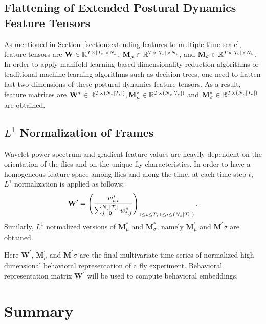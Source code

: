 \subsection{Flattening of Extended Postural Dynamics Feature Tensors}
As mentioned in Section~\ref{section:extending-features-to-multiple-time-scale}, feature tensors are $\mathbf{W} \in \mathbb{R}^{T \times \lvert\mathcal{T}_s\rvert \times N_s}$, $\mathbf{M}_\mu \in \mathbb{R}^{T \times \lvert\mathcal{T}_v\rvert \times N_v}$, and  $\mathbf{M}_\sigma \in \mathbb{R}^{T \times \lvert\mathcal{T}_v\rvert \times N_v}$.
In order to apply manifold learning based dimensionality reduction algorithms or traditional machine learning algorithms such as decision trees, one need to flatten last two dimensions of these postural dynamics feature tensors.
As a result, feature matrices are $\mathbf{W}^\ast \in \mathbb{R}^{T \times \left( N_s\lvert\mathcal{T}_s\rvert\right)}, \mathbf{M}_\mu^\ast \in \mathbb{R}^{T \times \left( N_v\lvert\mathcal{T}_v\rvert\right)}$ and $\mathbf{M}_\sigma^\ast \in \mathbb{R}^{T \times \left( N_v\lvert\mathcal{T}_v\rvert\right)}$ are obtained.

\subsection{\texorpdfstring{$L^1$}{L1} Normalization of Frames}
Wavelet power spectrum and gradient feature values are heavily dependent on the orientation of the flies and on the unique fly characteristics.
In order to have a homogeneous feature space among flies and along the time, at each time step $t$, $L^1$ normalization is applied as follows;
\begin{equation}
	\mathbf{W}^{\prime}  = \left(\frac{w^\ast_{t,i}}{\sum_{j=0}^{N_s \lvert\mathcal{T}_s\rvert}w^\ast_{t, j}}\right)_{1 \leq t \leq T, \, 1 \leq i \leq \left(N_s \lvert\mathcal{T}_s\rvert\right)}.
\end{equation}
Similarly, $L^1$ normalized versions of $\mathbf{M}^\ast_\mu$ and $\mathbf{M}^\ast_\sigma$, namely $\mathbf{M}^\prime_\mu$ and $\mathbf{M}^\prime\sigma$ are obtained.

Here $\mathbf{W}^\prime$, $\mathbf{M}^\prime_\mu$ and $\mathbf{M}^\prime\sigma$ are the final multivariate time series of normalized high dimensional behavioral representation of a fly experiment. Behavioral representation matrix $\mathbf{W}^\prime$ will be used to compute behavioral embeddings.

\section{Summary}
